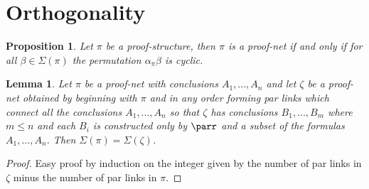 \documentclass[12pt]{article}
\theoremstyle{plain}
\newtheorem{proposition}[thm]{Proposition}
\newtheorem{lemma}[thm]{Lemma}
\theoremstyle{definition}
\begin{document}
\section{Orthogonality}









\begin{proposition}
Let $\pi$ be a proof-structure, then $\pi$ is a proof-net if and only if for all $\beta \in \Sigma(\pi)$ the permutation $\alpha_{\pi}\beta$ is cyclic.
\end{proposition}
\begin{lemma}\label{lem:pars_or_not}
Let $\pi$ be a proof-net with conclusions $A_1,...,A_n$ and let $\zeta$ be a proof-net obtained by beginning with $\pi$ and in any order forming par links which connect all the conclusions $A_1,...,A_n$ so that $\zeta$ has conclusions $B_1,...,B_m$ where $m \leq n$ and each $B_i$ is constructed only by $\parr$ and a subset of the formulas $A_1,...,A_n$. Then $\Sigma(\pi) = \Sigma(\zeta)$.
\end{lemma}
\begin{proof}
Easy proof by induction on the integer given by the number of par links in $\zeta$ minus the number of par links in $\pi$.
\end{proof}
\end{document}
